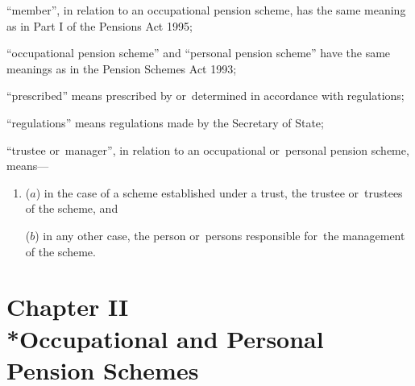 \documentclass[12pt,a4paper]{article}
\begin{document}
\begin{enumerate}
    “member”, in relation to an occupational pension scheme, has the same meaning as in Part I of the Pensions Act 1995;

    “occupational pension scheme” and “personal pension scheme” have the same meanings as in the Pension Schemes Act 1993;

    “prescribed” means prescribed by or~determined in accordance with regulations;

    “regulations” means regulations made by the Secretary of State;


“trustee or~manager”, in relation to an occupational or~personal pension scheme, means—
\begin{enumerate}\item[]
($a$) in the case of a scheme established under a trust, the trustee or~trustees of the scheme, and

($b$) in any other case, the person or~persons responsible for~the management of the scheme.
\end{enumerate}
\end{enumerate}


\section[Chapter II --- Occupational and Personal Pension Schemes]{Chapter II\\*Occupational and Personal Pension Schemes}
\renewcommand\parthead{--- Part II Chapter II}
\end{document}
